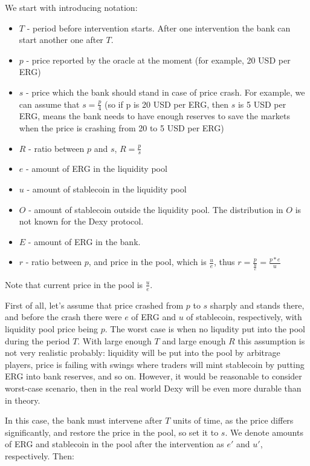 \documentclass{article}   %
\newcommand{\bc}{ERG}
\newcommand{\stc}{stablecoin}
\newcommand{\sct}{stablecoin}
\newcommand{\dx}{Dexy}
\begin{document}
We start with introducing notation: 
\begin{itemize}
  \item{} $T$ - period before intervention starts. After one intervention the bank can start another one after $T$. 
  \item{} $p$ - price reported by the oracle at the moment (for example, 20 USD per ERG)
  \item{} $s$ - price which the bank should stand in case of price crash. For example, we can assume that $s = \frac{p}{4}$ (so if p is 20 USD per ERG, then $s$ is 5 USD per ERG, means the bank needs to have enough reserves to save the markets when the price is crashing from 20 to 5 USD per ERG)
  \item{} $R$ - ratio between $p$ and $s$, $R = \frac{p}{s}$
  \item{} $e$ - amount of \bc{} in the liquidity pool 
  \item{} $u$ - amount of \stc{} in the liquidity pool
  \item{} $O$ - amount of \stc{} outside the liquidity pool. The distribution in $O$ is not known for the \dx{} protocol.
  \item{} $E$ - amount of \bc{} in the bank. 
  \item{} $r$ - ratio between $p$, and price in the pool, which is $\frac{u}{e}$, thus $r = \frac{p}{\frac{u}{e}} = \frac{p*e}{u}$
\end{itemize}  

Note that current price in the pool is $\frac{u}{e}$. 

First of all, let's assume that price crashed from $p$ to $s$ sharply and stands there, and before the crash there were $e$ of \bc{} and $u$ of \sct{}, respectively, with liquidity pool price being $p$. The worst case is when no liqudity put into the pool during the period $T$. With large enough $T$ and large enough $R$ this assumption is not very realistic probably: liquidity will be put into the pool by arbitrage players, price is failing with swings where traders will mint \sct{} by putting \bc{} into bank reserves, and so on. However, it would be reasonable to consider worst-case scenario, then in the real world \dx{} will be even more durable than in theory. 

In this case, the bank must intervene after $T$ units of time, as the price differs significantly, and restore the price in the pool, so set it to $s$. We denote amounts of \bc{} and \sct{} in the pool after the intervention as $e'$ and $u'$, respectively. Then:
\end{document}
